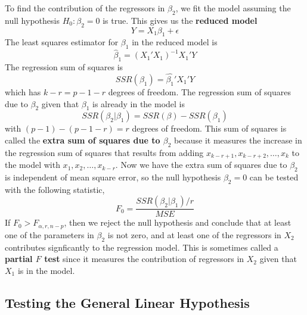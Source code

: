 To find the contribution of the regressors in $\beta_2$, we fit the model assuming the null hypothesis $H_0: \beta_2 = 0$ is true. This gives us the \textbf{reduced model}
\[Y = X_1\beta_1 + \epsilon\]
\noindent
The least squares estimator for $\beta_1$ in the reduced model is 
\[\hat{\beta}_1 = (X_1'X_1)^{-1}X_1'Y\]
The regression sum of squares is 
\[SSR(\beta_1) = \hat{\beta_1}'X_1'Y\]
which has $k-r = p - 1 - r$ degrees of freedom. The regression sum of squares due to $\beta_2$ given that $\beta_1$ is already in the model is 
\[SSR(\beta_2 | \beta_1) = SSR(\beta) - SSR(\beta_1)\]
with $(p-1) - (p - 1 -r) = r$ degrees of freedom. This sum of squares is called the \textbf{extra sum of squares due to $\beta_2$}  because it measures the increase in the regression sum of squares that results from adding $x_{k-r +1}, x_{k-r + 2}, \ldots, x_{k}$ to the model with $x_1,x_2, \ldots, x_{k-r}$. Now we have the extra sum of squares due to $\beta_2$ is independent of mean square error, so the null hypothesis $\beta_2=0$ can be tested with the following statistic,
\[F_0 = \frac{SSR(\beta_2|\beta_1)/r}{MSE}\]
 If $F_0 > F_{\alpha, r, n-p}$, then we reject the null hypothesis and conclude that at least one of the parameters in $\beta_2$ is not zero, and at least one of the regressors in $X_2$ contributes signficantly to the regression model. This is sometimes called a \textbf{partial $F$ test} since it measures the contribution of regressors in $X_2$ given that $X_1$ is in the model.

 \subsection{Testing the General Linear Hypothesis}

